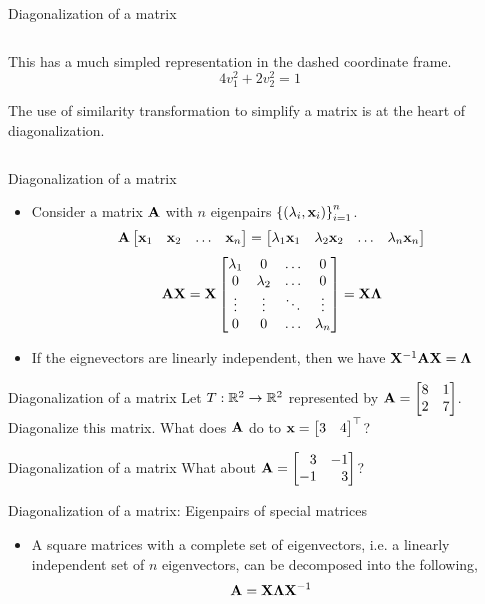 \documentclass[aspectratio=169]{beamer}
\let\olditem\item
\renewcommand{\item}{\setlength{\itemsep}{\fill}\olditem}
\def\mf{\ensuremath\mathbf}
\def\mb{\ensuremath\mathbb}
\def\bmx{\ensuremath\begin{bmatrix*}[r]}
\def\emx{\ensuremath\end{bmatrix*}}
\begin{document}
\begin{frame}[t]{Diagonalization of a matrix}
\begin{columns}
\begin{column}{0.5\textwidth}
This has a much simpled representation in the dashed coordinate frame. 
\[ 4v_1^2 + 2v_2^2 = 1 \]

The use of similarity transformation to simplify a matrix is at the heart of diagonalization.
\end{column}
\end{columns}
\end{frame}


\begin{frame}[t]{Diagonalization of a matrix}
\begin{itemize}
    \item Consider a matrix $\mf{A}$ with $n$ eigenpairs $\left\{\left(\lambda_i, \mf{x}_i\right)\right\}_{i=1}^n$.
    \[ \mf{A}\begin{bmatrix*}\mf{x}_1 & \mf{x}_2 & \ldots & \mf{x}_n\end{bmatrix*} = \begin{bmatrix*}\lambda_1\mf{x}_1 & \lambda_2\mf{x}_2 & \ldots & \lambda_n\mf{x}_n\end{bmatrix*} \]
    \[ \mf{AX} = \mf{X}\begin{bmatrix*}\lambda_1 & 0 & \ldots & 0\\0 & \lambda_2 & \ldots & 0\\\vdots & \vdots & \ddots & \vdots\\0 & 0 & \ldots & \lambda_n\end{bmatrix*} = \mf{X}\mf{\Lambda} \]

    \item If the eignevectors are linearly independent, then we have $\mf{X}^{-1}\mf{A}\mf{X} = \mf{\Lambda}$
\end{itemize}
\end{frame}


\begin{frame}[t]{Diagonalization of a matrix}
Let $T: \mb{R}^2 \to \mb{R}^2$ represented by $\mf{A} = \bmx 8 & 1\\2 & 7\emx$. Diagonalize this matrix. What does $\mf{A}$ do to $\mf{x} = \bmx 3 & 4\emx^\top$?
\end{frame}


\begin{frame}[t]{Diagonalization of a matrix}
What about $\mf{A} = \bmx 3 & -1\\-1 & 3\emx$?
\end{frame}


\begin{frame}[t]{Diagonalization of a matrix: Eigenpairs of special matrices}
\begin{itemize}
    \item A square matrices with a complete set of eigenvectors, i.e. a linearly independent set of $n$ eigenvectors, can be decomposed into the following,
    \[ \mf{A} = \mf{X}\mf{\Lambda}\mf{X}^{-1} \]
\end{itemize}
\end{frame}
\end{document}
